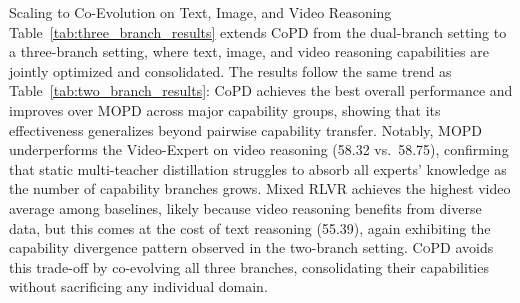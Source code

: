 \documentclass{llmxive}
\providecommand{\method}{\textsc{CoPD}\xspace}
\begin{document}
{Scaling to Co-Evolution on Text, Image, and Video Reasoning} Table~\ref{tab:three_branch_results} extends CoPD from the dual-branch setting to a three-branch setting, where text, image, and video reasoning capabilities are jointly optimized and consolidated. The results follow the same trend as Table~\ref{tab:two_branch_results}: CoPD achieves the best overall performance and improves over MOPD across major capability groups, showing that its effectiveness generalizes beyond pairwise capability transfer. Notably, MOPD underperforms the Video-Expert on video reasoning (58.32 vs.\ 58.75), confirming that static multi-teacher distillation struggles to absorb all experts' knowledge as the number of capability branches grows. Mixed RLVR achieves the highest video average among baselines, likely because video reasoning benefits from diverse data, but this comes at the cost of text reasoning (55.39), again exhibiting the capability divergence pattern observed in the two-branch setting. \method avoids this trade-off by co-evolving all three branches, consolidating their capabilities without sacrificing any individual domain.
\end{document}
